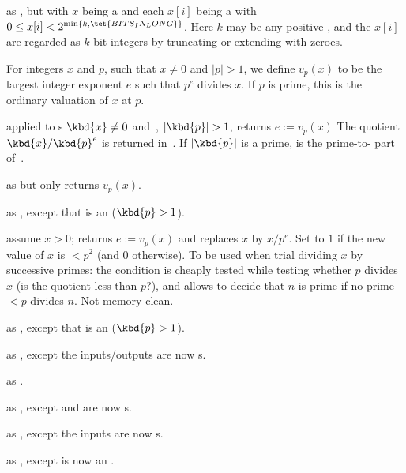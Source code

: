  as , but
with $x$ being a  and each $x[i]$ being a 
with $0\leq x[i] < 2^{\min\{k,\tet{BITS_IN_LONG}\}}$.  Here $k$ may be
any positive , and the $x[i]$ are regarded as $k$-bit
integers by truncating or extending with zeroes.

For integers $x$ and $p$, such that $x\neq 0$ and $|p| > 1$, we define
$v_p(x)$ to be the largest integer exponent $e$ such that $p^e$ divides $x$.
If $p$ is prime, this is the ordinary valuation of $x$ at $p$.

 applied to s
$\kbd{x}\neq 0$ and~, $|\kbd{p}| > 1$, returns $e := v_p(x)$
The quotient $\kbd{x}/\kbd{p}^e$ is returned in~. If
$|\kbd{p}|$ is a prime,  is the prime-to- part of~.

 as  but only returns
$v_p(x)$.

 as ,
except that  is an  ($\kbd{p} > 1$).

 assume $x > 0$;
returns $e := v_p(x)$ and replaces $x$ by $x / p^e$. Set  to $1$ if
the new value of $x$ is $ < p^2$ (and $0$ otherwise). To be used when trial
dividing $x$ by successive primes: the  condition is cheaply tested
while testing whether $p$ divides $x$ (is the quotient less than $p$?), and
allows to decide that $n$ is prime if no prime $< p$ divides $n$. Not
memory-clean.

 as ,
except that  is an  ($\kbd{p} > 1$).

 as ,
except the inputs/outputs are now s.

 as
.

 as ,
except  and  are now s.

 as ,
except the inputs are now s.

 as ,
except  is now an .

